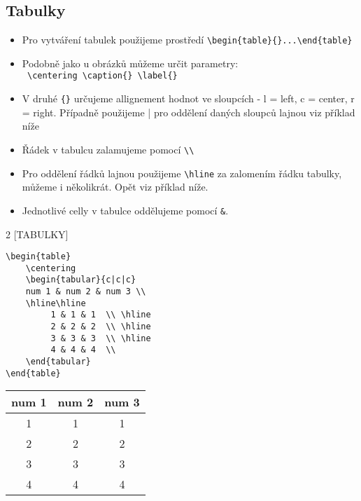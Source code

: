 \subsection{Tabulky}
\begin{itemize}
    \item Pro vytváření tabulek použijeme prostředí \verb|\begin{table}{}...\end{table}|
    \item Podobně jako u obrázků můžeme určit parametry:\\ \verb| \centering \caption{} \label{}|
    \item V druhé \verb|{}| určujeme allignement hodnot ve sloupcích - l = left, c = center, r = right. Případně použijeme | pro oddělení daných sloupců lajnou viz příklad níže
    \item Řádek v tabulcu zalamujeme pomocí \verb|\\|
    \item Pro oddělení řádků lajnou použijeme \verb|\hline| za zalomením řádku tabulky, můžeme i několikrát. Opět viz příklad níže.
    \item Jednotlivé celly v tabulce oddělujeme pomocí \verb|&|.
 \end{itemize}
%
%

\begin{multicols}{2}
    [TABULKY]

\begin{lstlisting}[frame = single]
\begin{table}
    \centering
    \begin{tabular}{c|c|c}
    num 1 & num 2 & num 3 \\
    \hline\hline
         1 & 1 & 1  \\ \hline
         2 & 2 & 2  \\ \hline
         3 & 3 & 3  \\ \hline
         4 & 4 & 4  \\ 
    \end{tabular}
\end{table}
\end{lstlisting}
\columnbreak

    \begin{tabular}{c|c|c}
    num 1 & num 2 & num 3 \\ \hline\hline
        1 & 1 & 1  \\ \hline
        2 & 2 & 2  \\ \hline
        3 & 3 & 3  \\ \hline
        4 & 4 & 4  \\ 
    \end{tabular}
\end{multicols}



